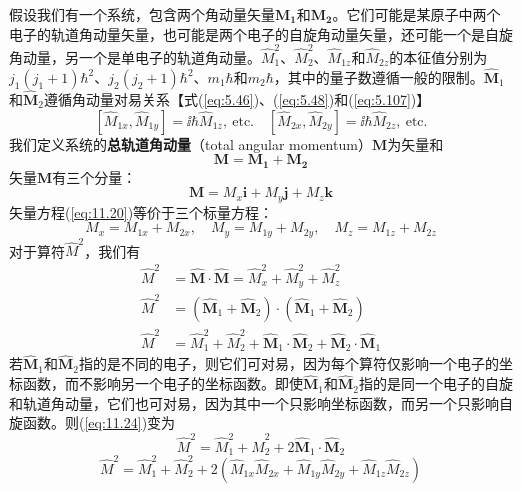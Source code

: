     假设我们有一个系统，包含两个角动量矢量$\mathbf{M_1}$和$\mathbf{M_2}$。它们可能是某原子中两个电子的轨道角动量矢量，也可能是两个电子的自旋角动量矢量，还可能一个是自旋角动量，另一个是单电子的轨道角动量。$\hat{M}_1^2$、$\hat{M}_2^2$、$\hat{M}_{1z}$和$\hat{M}_{2z}$的本征值分别为$j_1\left(j_1 + 1\right)\hbar^2$、$j_2\left(j_2 + 1\right)\hbar^2$、$m_1\hbar$和$m_2\hbar$，其中的量子数遵循一般的限制。$\hat{\mathbf{M}}_1$和$\hat{\mathbf{M}}_2$遵循角动量对易关系【式(\ref{eq:5.46})、(\ref{eq:5.48})和(\ref{eq:5.107})】
    \begin{equation}
        \left[\hat{M}_{1x}, \hat{M}_{1y}\right] = \ii \hbar \hat{M}_{1z}, \: \text{etc.} \quad \left[\hat{M}_{2x}, \hat{M}_{2y}\right] = \ii \hbar \hat{M}_{2z}, \: \text{etc.}
        \label{eq:11.19}
    \end{equation}
    我们定义系统的\textbf{总轨道角动量}（total angular momentum）$\mathbf{M}$为矢量和
    \begin{equation}
        \mathbf{M} = \mathbf{M_1} + \mathbf{M_2}
        \label{eq:11.20}
    \end{equation}
    矢量$\mathbf{M}$有三个分量：
    \begin{equation}
        \mathbf{M} = M_x \mathbf{i} + M_y \mathbf{j} + M_z \mathbf{k}
        \label{eq:11.21}
    \end{equation}
    矢量方程(\ref{eq:11.20})等价于三个标量方程：
    \begin{equation}
        M_x = M_{1x} + M_{2x}, \quad M_y = M_{1y} + M_{2y}, \quad M_z = M_{1z} + M_{2z}
        \label{eq:11.22}
    \end{equation}
    对于算符$\hat{M}^2$，我们有
    \begin{align}
        \hat{M}^2 &= \hat{\mathbf{M}} \cdot \hat{\mathbf{M}} = \hat{M}_x^2 + \hat{M}_y^2 + \hat{M}_z^2 \label{eq:11.23} \\
        \hat{M}^2 &= \left(\hat{\mathbf{M}}_1 + \hat{\mathbf{M}}_2\right) \cdot \left(\hat{\mathbf{M}}_1 + \hat{\mathbf{M}}_2\right) \nonumber \\
        \hat{M}^2 &= \hat{M}_1^2 + \hat{M}_2^2 + \hat{\mathbf{M}}_1 \cdot \hat{\mathbf{M}}_2 + \hat{\mathbf{M}}_2 \cdot \hat{\mathbf{M}}_1 \label{eq:11.24}
    \end{align}
    若$\hat{\mathbf{M}}_1$和$\hat{\mathbf{M}}_2$指的是不同的电子，则它们可对易，因为每个算符仅影响一个电子的坐标函数，而不影响另一个电子的坐标函数。即使$\hat{\mathbf{M}}_1$和$\hat{\mathbf{M}}_2$指的是同一个电子的自旋和轨道角动量，它们也可对易，因为其中一个只影响坐标函数，而另一个只影响自旋函数。则(\ref{eq:11.24})变为
    \begin{equation}
        \hat{M}^2 = \hat{M}_1^2 + \hat{M}_2^2 + 2\hat{\mathbf{M}}_1 \cdot \hat{\mathbf{M}}_2
        \label{eq:11.25}
    \end{equation}
    \begin{equation}
        \hat{M}^2 = \hat{M}_1^2 + \hat{M}_2^2 + 2\left(\hat{M}_{1x}\hat{M}_{2x} + \hat{M}_{1y}\hat{M}_{2y} + \hat{M}_{1z}\hat{M}_{2z}\right)
        \label{eq:11.26}
    \end{equation}

